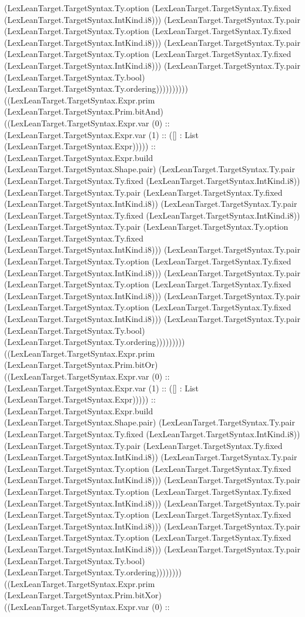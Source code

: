 \documentclass[11pt]{article}
\begin{document}
(LexLeanTarget.TargetSyntax.Ty.option (LexLeanTarget.TargetSyntax.Ty.fixed (LexLeanTarget.TargetSyntax.IntKind.i8))) (LexLeanTarget.TargetSyntax.Ty.pair (LexLeanTarget.TargetSyntax.Ty.option (LexLeanTarget.TargetSyntax.Ty.fixed (LexLeanTarget.TargetSyntax.IntKind.i8))) (LexLeanTarget.TargetSyntax.Ty.pair (LexLeanTarget.TargetSyntax.Ty.option (LexLeanTarget.TargetSyntax.Ty.fixed (LexLeanTarget.TargetSyntax.IntKind.i8))) (LexLeanTarget.TargetSyntax.Ty.pair (LexLeanTarget.TargetSyntax.Ty.bool) (LexLeanTarget.TargetSyntax.Ty.ordering)))))))))) ((LexLeanTarget.TargetSyntax.Expr.prim (LexLeanTarget.TargetSyntax.Prim.bitAnd) ((LexLeanTarget.TargetSyntax.Expr.var (0) :: (LexLeanTarget.TargetSyntax.Expr.var (1) :: ([] : List (LexLeanTarget.TargetSyntax.Expr))))) :: (LexLeanTarget.TargetSyntax.Expr.build (LexLeanTarget.TargetSyntax.Shape.pair) (LexLeanTarget.TargetSyntax.Ty.pair (LexLeanTarget.TargetSyntax.Ty.fixed (LexLeanTarget.TargetSyntax.IntKind.i8)) (LexLeanTarget.TargetSyntax.Ty.pair (LexLeanTarget.TargetSyntax.Ty.fixed (LexLeanTarget.TargetSyntax.IntKind.i8)) (LexLeanTarget.TargetSyntax.Ty.pair (LexLeanTarget.TargetSyntax.Ty.fixed (LexLeanTarget.TargetSyntax.IntKind.i8)) (LexLeanTarget.TargetSyntax.Ty.pair (LexLeanTarget.TargetSyntax.Ty.option (LexLeanTarget.TargetSyntax.Ty.fixed (LexLeanTarget.TargetSyntax.IntKind.i8))) (LexLeanTarget.TargetSyntax.Ty.pair (LexLeanTarget.TargetSyntax.Ty.option (LexLeanTarget.TargetSyntax.Ty.fixed (LexLeanTarget.TargetSyntax.IntKind.i8))) (LexLeanTarget.TargetSyntax.Ty.pair (LexLeanTarget.TargetSyntax.Ty.option (LexLeanTarget.TargetSyntax.Ty.fixed (LexLeanTarget.TargetSyntax.IntKind.i8))) (LexLeanTarget.TargetSyntax.Ty.pair (LexLeanTarget.TargetSyntax.Ty.option (LexLeanTarget.TargetSyntax.Ty.fixed (LexLeanTarget.TargetSyntax.IntKind.i8))) (LexLeanTarget.TargetSyntax.Ty.pair (LexLeanTarget.TargetSyntax.Ty.bool) (LexLeanTarget.TargetSyntax.Ty.ordering))))))))) ((LexLeanTarget.TargetSyntax.Expr.prim (LexLeanTarget.TargetSyntax.Prim.bitOr) ((LexLeanTarget.TargetSyntax.Expr.var (0) :: (LexLeanTarget.TargetSyntax.Expr.var (1) :: ([] : List (LexLeanTarget.TargetSyntax.Expr))))) :: (LexLeanTarget.TargetSyntax.Expr.build (LexLeanTarget.TargetSyntax.Shape.pair) (LexLeanTarget.TargetSyntax.Ty.pair (LexLeanTarget.TargetSyntax.Ty.fixed (LexLeanTarget.TargetSyntax.IntKind.i8)) (LexLeanTarget.TargetSyntax.Ty.pair (LexLeanTarget.TargetSyntax.Ty.fixed (LexLeanTarget.TargetSyntax.IntKind.i8)) (LexLeanTarget.TargetSyntax.Ty.pair (LexLeanTarget.TargetSyntax.Ty.option (LexLeanTarget.TargetSyntax.Ty.fixed (LexLeanTarget.TargetSyntax.IntKind.i8))) (LexLeanTarget.TargetSyntax.Ty.pair (LexLeanTarget.TargetSyntax.Ty.option (LexLeanTarget.TargetSyntax.Ty.fixed (LexLeanTarget.TargetSyntax.IntKind.i8))) (LexLeanTarget.TargetSyntax.Ty.pair (LexLeanTarget.TargetSyntax.Ty.option (LexLeanTarget.TargetSyntax.Ty.fixed (LexLeanTarget.TargetSyntax.IntKind.i8))) (LexLeanTarget.TargetSyntax.Ty.pair (LexLeanTarget.TargetSyntax.Ty.option (LexLeanTarget.TargetSyntax.Ty.fixed (LexLeanTarget.TargetSyntax.IntKind.i8))) (LexLeanTarget.TargetSyntax.Ty.pair (LexLeanTarget.TargetSyntax.Ty.bool) (LexLeanTarget.TargetSyntax.Ty.ordering)))))))) ((LexLeanTarget.TargetSyntax.Expr.prim (LexLeanTarget.TargetSyntax.Prim.bitXor) ((LexLeanTarget.TargetSyntax.Expr.var (0) :: 
\end{document}
